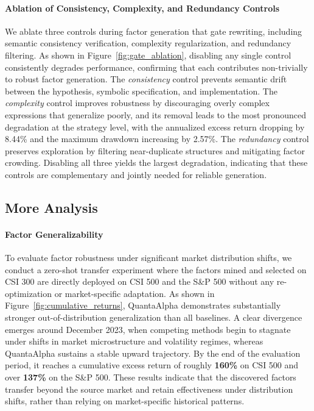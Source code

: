 \paragraph{Ablation of Consistency, Complexity, and Redundancy Controls} We ablate three controls during factor generation that gate rewriting, including semantic consistency verification, complexity regularization, and redundancy filtering. As shown in Figure~\ref{fig:gate_ablation}, disabling any single control consistently degrades performance, confirming that each contributes non-trivially to robust factor generation. The \emph{consistency} control prevents semantic drift between the hypothesis, symbolic specification, and implementation. The \emph{complexity} control improves robustness by discouraging overly complex expressions that generalize poorly, and its removal leads to the most pronounced degradation at the strategy level, with the annualized excess return dropping by 8.44\% and the maximum drawdown increasing by 2.57\%. The \emph{redundancy} control preserves exploration by filtering near-duplicate structures and mitigating factor crowding. Disabling all three yields the largest degradation, indicating that these controls are complementary and jointly needed for reliable generation.

\subsection{More Analysis}

\paragraph{Factor Generalizability} To evaluate factor robustness under significant market distribution shifts, we conduct a zero-shot transfer experiment where the factors mined and selected on CSI 300 are directly deployed on CSI 500 and the S\&P 500 without any re-optimization or market-specific adaptation. As shown in Figure~\ref{fig:cumulative_returns}, QuantaAlpha demonstrates substantially stronger out-of-distribution generalization than all baselines. A clear divergence emerges around December 2023, when competing methods begin to stagnate under shifts in market microstructure and volatility regimes, whereas QuantaAlpha sustains a stable upward trajectory. By the end of the evaluation period, it reaches a cumulative excess return of roughly \textbf{160\%} on CSI 500 and over \textbf{137\%} on the S\&P 500. These results indicate that the discovered factors transfer beyond the source market and retain effectiveness under distribution shifts, rather than relying on market-specific historical patterns.

